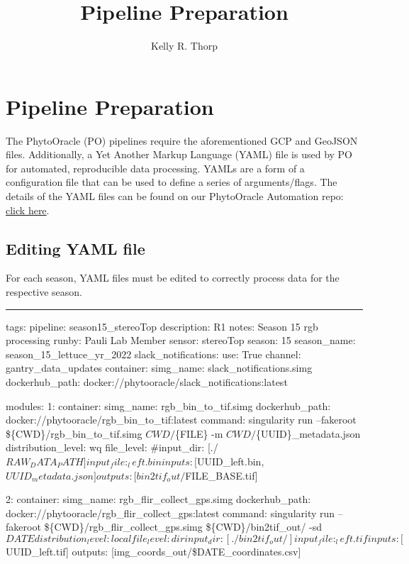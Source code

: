 \documentclass[
]{article}
\title{Pipeline Preparation}
\author{Kelly R. Thorp}
\date{}
\begin{document}
\maketitle

\newpage

\hypertarget{pipeline-preparation}{%
\section{Pipeline Preparation}\label{pipeline-preparation}}

The PhytoOracle (PO) pipelines require the aforementioned GCP and
GeoJSON files. Additionally, a Yet Another Markup Language (YAML) file
is used by PO for automated, reproducible data processing. YAMLs are a
form of a configuration file that can be used to define a series of
arguments/flags. The details of the YAML files can be found on our
PhytoOracle Automation repo:
\href{https://github.com/phytooracle/automation/blob/main/docs/yaml.md}{click
here}.

\hypertarget{editing-yaml-file}{%
\subsection{Editing YAML file}\label{editing-yaml-file}}

For each season, YAML files must be edited to correctly process data for
the respective season.

\begin{center}\rule{0.5\linewidth}{0.5pt}\end{center}

tags: pipeline: season15\_stereoTop description: R1 notes: Season 15 rgb
processing runby: Pauli Lab Member sensor: stereoTop season: 15
season\_name: season\_15\_lettuce\_yr\_2022 slack\_notifications: use:
True channel: gantry\_data\_updates container: simg\_name:
slack\_notifications.simg dockerhub\_path:
docker://phytooracle/slack\_notifications:latest

modules: 1: container: simg\_name: rgb\_bin\_to\_tif.simg
dockerhub\_path: docker://phytooracle/rgb\_bin\_to\_tif:latest command:
singularity run --fakeroot \$\{CWD\}/rgb\_bin\_to\_tif.simg
\({CWD}/\)\{FILE\} -m \({CWD}/\)\{UUID\}\_metadata.json
distribution\_level: wq file\_level: \#input\_dir:
{[}./\(RAW_DATA_PATH]  input_file: _left.bin  inputs: [\)UUID\_left.bin,
\(UUID_metadata.json]  outputs: [bin2tif_out/\)FILE\_BASE.tif{]}

2: container: simg\_name: rgb\_flir\_collect\_gps.simg dockerhub\_path:
docker://phytooracle/rgb\_flir\_collect\_gps:latest command: singularity
run --fakeroot \$\{CWD\}/rgb\_flir\_collect\_gps.simg
\$\{CWD\}/bin2tif\_out/ -sd
\({DATE}  distribution_level: local  file_level: dir  input_dir: [./bin2tif_out/]  input_file: _left.tif  inputs: [\)UUID\_left.tif{]}
outputs: {[}img\_coords\_out/\$DATE\_coordinates.csv{]}
\end{document}

